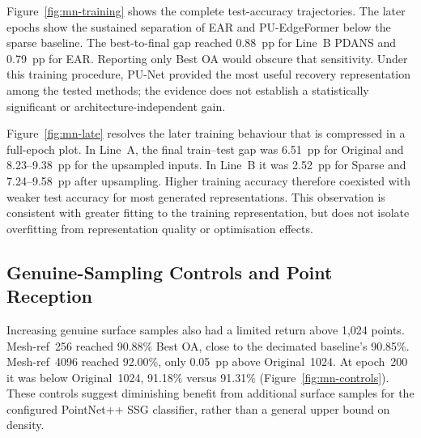 Figure~\ref{fig:mn-training} shows the complete test-accuracy trajectories.
The later epochs show the sustained separation of EAR and PU-EdgeFormer
below the sparse baseline. The best-to-final gap reached 0.88~pp for
Line~B PDANS and 0.79~pp for EAR. Reporting only Best OA would obscure
that sensitivity. Under this training procedure, PU-Net provided the most
useful recovery representation among the tested methods; the evidence does
not establish a statistically significant or architecture-independent gain.


Figure~\ref{fig:mn-late} resolves the later training behaviour that is
compressed in a full-epoch plot. In Line~A, the final train--test gap
was 6.51~pp for Original and 8.23--9.38~pp for the upsampled inputs.
In Line~B it was 2.52~pp for Sparse and 7.24--9.58~pp after upsampling.
Higher training accuracy therefore coexisted with weaker test accuracy
for most generated representations. This observation is consistent with
greater fitting to the training representation, but does not isolate
overfitting from representation quality or optimisation effects.

\FloatBarrier


\subsection{Genuine-Sampling Controls and Point Reception}
\label{sec:controls}

Increasing genuine surface samples also had a limited return above 1,024
points. Mesh-ref~256 reached 90.88\% Best OA, close to the decimated
baseline's 90.85\%. Mesh-ref~4096 reached 92.00\%, only 0.05~pp
above Original~1024. At epoch~200 it was below Original~1024,
91.18\% versus 91.31\% (Figure~\ref{fig:mn-controls}). These controls
suggest diminishing benefit from additional surface samples for the configured
PointNet++ SSG classifier, rather than a general upper bound on density.

